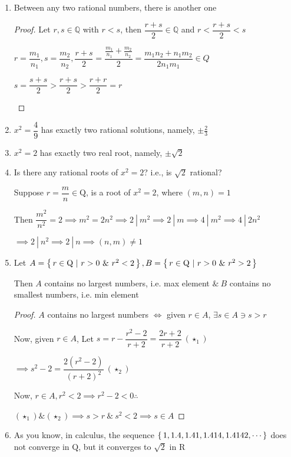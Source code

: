 \begin{ex*} $ $
	\begin{enumerate}
		\item Between any two rational numbers, there is another one
		
		\begin{proof}
			Let $r,s \in \mathbb{Q}$ with $r<s$, then $\dfrac{r+s}{2} \in \mathbb{Q}$ and $r < \dfrac{r+s}{2} < s$
			
			\begin{tcolorbox}
				$r = \dfrac{m_1}{n_1}, s = \dfrac{m_2}{n_2}, \dfrac{r+s}{2} = \dfrac{\frac{m_1}{n_1}+\frac{m_2}{n_2}}{{2}} = \dfrac{m_1n_2 + n_1m_2}{2n_1m_1} 
				\in Q$
				
				$s = \dfrac{s+s}{2} > \dfrac{r + s}{2} > \dfrac{r+r}{2} = r$
			\end{tcolorbox}
		\end{proof}
		
		\item $x^2 = \dfrac{4}{9}$ has exactly two rational solutions, namely, $\pm \frac{2}{3}$
		\item $x^2 = 2$ has exactly two real root, namely, $\pm \sqrt{2}$
		\item Is there any rational roots of $x^2 = 2$? i.e., is $\sqrt{2}$ rational?
		\begin{tcolorbox}
			Suppose $r = \dfrac{m}{n} \in \mathrm{Q}$, is a root of $x^2 = 2$, where $(m,n) = 1$
			
			Then $\dfrac{m^2}{n^2} = 2 \implies m^2 = 2n^2 \implies 2~|~m^2 \implies 2~|~m \implies 4~|~m^2 \implies 4~|~2n^2$
			
			$\implies 2 ~|~ n^2 \implies 2 ~|~ n \implies (n,m) \neq 1$
		\end{tcolorbox}
		\item Let $A = \left\{ \,r \in \mathrm{Q}~|~r > 0 ~\& ~r^2 < 2 \,\right\}, B = \left\{ \,r \in \mathrm{Q}~|~r>0 ~\& ~r^2 > 2 \,\right\}$
		
		Then $A$ contains no largest numbers, i.e. max element $\& ~B$ contains no smallest numbers, i.e. min element
		\begin{tcolorbox}
			\begin{proof}
				$A$ contains no largest numbers $\Leftrightarrow$ given $r \in A$, $\exists s \in A \ni s>r$
				
				Now, given $r \in A$, Let $s = r - \dfrac{r^2 - 2}{r+2} = \dfrac{2r + 2}{r+2} ~(\star_1)$
				
				$\implies s^2 - 2 = \dfrac{2(r^2 - 2)}{(r+2)^2} ~(\star_2)$
				
				Now, $r \in A, r^2 < 2 \implies r^2-2 <0 \therefore $
				
				$(\star_1)\&(\star_2) \implies s > r ~\& ~s^2 < 2 \implies s \in A$
			\end{proof}
		\end{tcolorbox}
		\item As you know, in calculus, the sequence $\left\{ \,1,1.4,1.41,1.414,1.4142,\cdots \,\right\}$ does not converge in $\mathrm{Q}$, but it converges to $\sqrt{2}$ in $\mathrm{R}$
	\end{enumerate}
\end{ex*}

